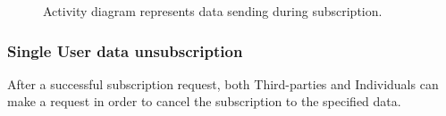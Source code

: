              \begin{figure}[H]
                \centering
                \caption{Activity diagram represents data sending during subscription.}
                \label{fig:Sending-subscribed-data}
            \end{figure}
            
        \subsubsection{Single User data unsubscription}
            After a successful subscription request, both Third-parties and Individuals can make a request in order to cancel the subscription to the specified data.

